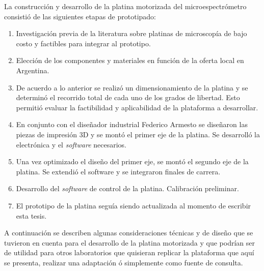 La construcción y desarrollo de la platina motorizada del microespectrómetro consistió de las siguientes etapas de prototipado:

\begin{enumerate}
\item Investigación previa de la literatura sobre platinas de microscopía de bajo costo y factibles para integrar al prototipo.
\item Elección de los componentes y materiales en función de la oferta local en Argentina.
\item De acuerdo a lo anterior se realizó un dimensionamiento de la platina y se determinó el recorrido total de cada uno de los grados de libertad. Esto permitió evaluar la factibilidad y aplicabilidad de la plataforma a desarrollar.
\item En conjunto con el diseñador industrial Federico Armesto se diseñaron las piezas de impresión 3D y se montó el primer eje de la platina. Se desarrolló la electrónica y el \textit{software} necesarios.
\item Una vez optimizado el diseño del primer eje, se montó el segundo eje de la platina. Se extendió el software y se integraron finales de carrera.
\item Desarrollo del \textit{software} de control de la platina. Calibración preliminar.
\item El prototipo de la platina seguía siendo actualizada al momento de escribir esta tesis.
\end{enumerate}

A continuación se describen algunas consideraciones técnicas y de diseño que se tuvieron en cuenta para el desarrollo de la platina motorizada y que podrían ser de utilidad para otros laboratorios que quisieran replicar la plataforma que aquí se presenta, realizar una adaptación ó simplemente como fuente de consulta.

